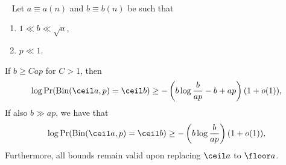 %
\begin{lemma}
\label{lemma:binom_lb}
%
~\\~
    Let \(a \equiv a(n)\) and \(b \equiv b(n)\) be such that
    \begin{enumerate}
        \item \(1 \ll b \ll \sqrt{a}\),
        \item \(p \ll 1\). 
    \end{enumerate}
    If \(b \geq C ap\) for \(C > 1\), then 
    \begin{equation}
    \label{eq:binom_lb_small_b}
        \log \Pr(\mathrm{Bin}(\ceil a, p) = \ceil b) \geq -\left(b \log \frac{b}{a p} - b + ap\right) (1 + o(1)),
    \end{equation}
    If also \(b \gg ap\), we have that 
    \begin{equation}
    \label{eq:binom_lb_large_b}
        \log \Pr(\mathrm{Bin}(\ceil a, p) = \ceil b) \geq -\left(b \log \frac{b}{a p}\right) (1 + o(1)),
    \end{equation}
Furthermore, all bounds remain valid upon replacing \(\ceil a\) to \(\floor a\).
\end{lemma}
